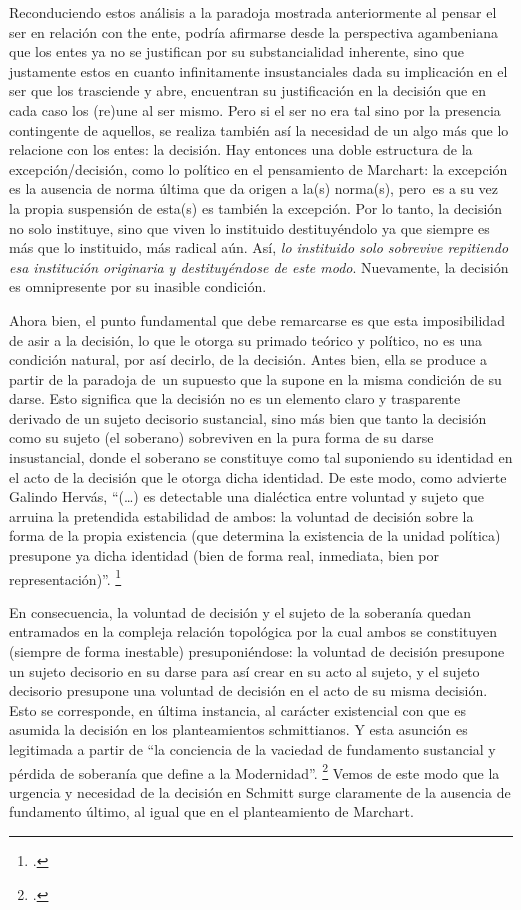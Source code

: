 Reconduciendo estos análisis a la paradoja mostrada anteriormente al pensar el ser en relación con the ente, podría afirmarse desde la perspectiva agambeniana que los entes ya no se justifican por su substancialidad inherente, sino que justamente estos en cuanto infinitamente insustanciales dada su implicación en el ser que los trasciende y abre, encuentran su justificación en la decisión que en cada caso los (re)une al ser mismo. Pero si el ser no era tal sino por la presencia contingente de aquellos, se realiza también así la necesidad de un algo más que lo relacione con los entes: la decisión. Hay entonces una doble estructura de la excepción/decisión, como lo político en el pensamiento de Marchart: la excepción es la ausencia de norma última que da origen a la(s) norma(s), pero~es a su vez la propia suspensión de esta(s) es también la excepción. Por lo tanto, la decisión no solo instituye, sino que viven lo instituido destituyéndolo ya que siempre es más que lo instituido, más radical aún. Así, \emph{lo instituido solo sobrevive repitiendo esa institución originaria y destituyéndose de este modo}. Nuevamente, la decisión es omnipresente por su inasible condición.

Ahora bien, el punto fundamental que debe remarcarse es que esta imposibilidad de asir a la decisión, lo que le otorga su primado teórico y político, no es una condición natural, por así decirlo, de la decisión. Antes bien, ella se produce a partir de la paradoja de~un supuesto que la supone en la misma condición de su darse. Esto significa que la decisión no es un elemento claro y trasparente derivado de un sujeto decisorio sustancial, sino más bien que tanto la decisión como su sujeto (el soberano) sobreviven en la pura forma de su darse insustancial, donde el soberano se constituye como tal suponiendo su identidad en el acto de la decisión que le otorga dicha identidad. De este modo, como advierte Galindo Hervás, \enquote{(\ldots) es detectable una dialéctica entre voluntad y sujeto que arruina la pretendida estabilidad de ambos: la voluntad de decisión sobre la forma de la propia existencia (que determina la existencia de la unidad política) presupone ya dicha identidad (bien de forma real, inmediata, bien por representación)}. \footcite[38]{@7088-GALINDOHERVAS2003}

En consecuencia, la voluntad de decisión y el sujeto de la soberanía quedan entramados en la compleja relación topológica por la cual ambos se constituyen (siempre de forma inestable) presuponiéndose: la voluntad de decisión presupone un sujeto decisorio en su darse para así crear en su acto al sujeto, y el sujeto decisorio presupone una voluntad de decisión en el acto de su misma decisión. Esto se corresponde, en última instancia, al carácter existencial con que es asumida la decisión en los planteamientos schmittianos. Y esta asunción es legitimada a partir de \enquote{la conciencia de la vaciedad de fundamento sustancial y pérdida de soberanía que define a la Modernidad}. \footcite[50]{@7088-GALINDOHERVAS2003} Vemos de este modo que la urgencia y necesidad de la decisión en Schmitt surge claramente de la ausencia de fundamento último, al igual que en el planteamiento de Marchart.

